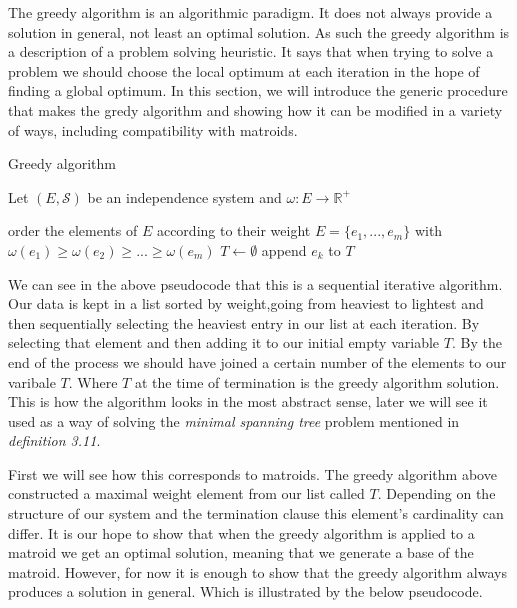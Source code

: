 \documentclass[../main.tex]{subfiles}
\begin{document}
The greedy algorithm is an algorithmic paradigm. It does not always provide a solution in general, not least an optimal solution. As such the greedy algorithm is a description of a problem solving heuristic.  It says that when trying to solve a problem we should choose the local optimum at each iteration in the hope of finding a global optimum. In this section, we will introduce the generic procedure that makes the gredy algorithm and showing how it can be modified in a variety of ways, including compatibility with matroids.

\begin{algorithm}[H]
\caption{Greedy algorithm}\label{greedy}
Let $(E,\mathcal{S})$ be an independence system and $\omega:E \longrightarrow \mathbb{R^+}$
\begin{algorithmic}[1]
\State order the elements of $E$ according to their weight
\State $E = \{ e_1,...,e_m\}$ with $\omega(e_1) \geq \omega(e_2) \geq ... \geq \omega(e_m)$
\State $T\gets \emptyset$
	 	\State append $e_k$ to $T$
	\EndIf
\EndFor
\EndProcedure
\end{algorithmic}
\end{algorithm}

\noindent We can see in the above pseudocode that this is a sequential iterative algorithm. Our data is kept in a list sorted by weight,going from heaviest to lightest and then sequentially selecting the heaviest entry in our list at each iteration. By selecting that element and then adding it to our initial empty variable $T.$ By the end of the process we should have joined a certain number of the elements to our varibale $T.$ Where $T$ at the time of termination is the greedy algorithm solution. This is how the algorithm looks in the most abstract sense, later we will see it used as a way of solving the \textit{minimal spanning tree} problem mentioned in \textit{definition 3.11}.

\noindent First we will see how this corresponds to matroids. The greedy algorithm above constructed a maximal weight element from our list called $T.$ Depending on the structure of our system and the termination clause this element's cardinality can differ. It is our hope to show that when the greedy algorithm is applied to a matroid we get an optimal solution, meaning that we generate a base of the matroid. However, for now it is enough to show that the greedy algorithm always produces a solution in general. Which is illustrated by the below pseudocode.
\end{document}
